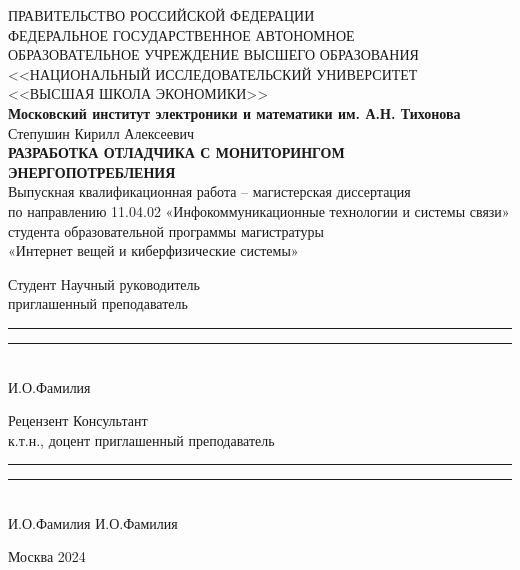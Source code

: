 \begin{titlepage}
    \newpage
    
    \begin{center}
    ПРАВИТЕЛЬСТВО РОССИЙСКОЙ ФЕДЕРАЦИИ \\
    \vspace{1em}
    ФЕДЕРАЛЬНОЕ  ГОСУДАРСТВЕННОЕ АВТОНОМНОЕ \\
    ОБРАЗОВАТЕЛЬНОЕ УЧРЕЖДЕНИЕ ВЫСШЕГО ОБРАЗОВАНИЯ \\
    <<НАЦИОНАЛЬНЫЙ ИССЛЕДОВАТЕЛЬСКИЙ УНИВЕРСИТЕТ \\
    <<ВЫСШАЯ ШКОЛА ЭКОНОМИКИ>> \\
    \vspace{2em}
    \textbf{Московский институт электроники и математики им. А.Н. Тихонова}\\
    \vspace{6em}
    Степушин Кирилл Алексеевич\\
    \vspace{3em}
    \textbf{РАЗРАБОТКА ОТЛАДЧИКА С МОНИТОРИНГОМ ЭНЕРГОПОТРЕБЛЕНИЯ}\\
    \vspace{6em}
    Выпускная квалификационная работа -- магистерская диссертация\\ 
    по направлению 11.04.02 «Инфокоммуникационные технологии и системы связи»\\
    студента образовательной программы магистратуры\\
    «Интернет вещей и киберфизические системы»
    \end{center}

    \vspace{6em}

    \begin{flushleft}
    Студент \hfill Научный руководитель\\
    \hfill приглашенный преподаватель\\
    \vspace{1em}
    \rule{5cm}{0.005cm} \hfill \rule{5cm}{0.01cm}\\
    \hfill И.О.Фамилия

    \vspace{1em}

    Рецензент \hfill Консультант\\
    к.т.н., доцент \hfill приглашенный преподаватель\\
    \vspace{1em}
    \rule{5cm}{0.005cm} \hfill \rule{5cm}{0.01cm}\\
    И.О.Фамилия \hfill И.О.Фамилия
    \end{flushleft}
    
    \vspace{\fill}
    
    \begin{center}
    Москва 2024
    \end{center}
    
    \end{titlepage}